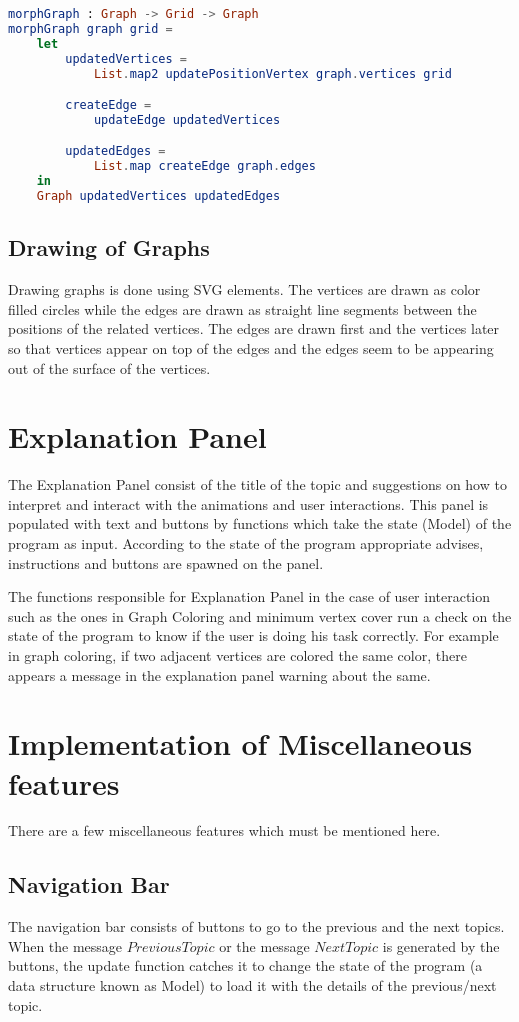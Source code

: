 \begin{lstlisting}[language=elm]
morphGraph : Graph -> Grid -> Graph
morphGraph graph grid =
    let
        updatedVertices =
            List.map2 updatePositionVertex graph.vertices grid

        createEdge =
            updateEdge updatedVertices

        updatedEdges =
            List.map createEdge graph.edges
    in
    Graph updatedVertices updatedEdges
\end{lstlisting}

\subsection{Drawing of Graphs}
Drawing graphs is done using SVG elements. The vertices are drawn as color
filled circles while the edges are drawn as straight line segments between the
positions of the related vertices. The edges are drawn first and the vertices
later so that vertices appear on top of the edges and the edges seem to be
appearing out of the surface of the vertices.

\section{Explanation Panel}
The Explanation Panel consist of the title of the topic and suggestions on how
to interpret and interact with the animations and user interactions. This panel
is populated with text and buttons by functions which take the state (Model) of
the program as input. According to the state of the program appropriate
advises, instructions and buttons are spawned on the panel.

The functions responsible for Explanation Panel in the case of user interaction
such as the ones in Graph Coloring and minimum vertex cover run a check on the
state of the program to know if the user is doing his task correctly. For
example in graph coloring, if two adjacent vertices are colored the same color,
there appears a message in the explanation panel warning about the same.

\section{Implementation of Miscellaneous features}
There are a few miscellaneous features which must be mentioned here.
\subsection{Navigation Bar}
The navigation bar consists of buttons to go to the previous and the next
topics.  When the message $PreviousTopic$ or the message $NextTopic$ is
generated by the buttons, the update function catches it to change the state of
the program (a data structure known as Model) to load it with the details of
the previous/next topic.

